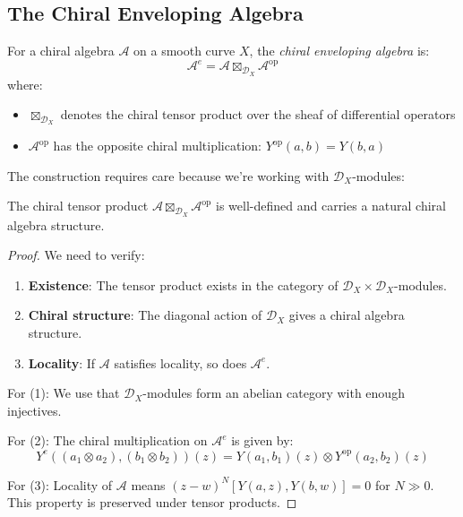 \subsection{The Chiral Enveloping Algebra}

\begin{definition}
For a chiral algebra $\mathcal{A}$ on a smooth curve $X$, the \emph{chiral enveloping algebra} is:
\[
\mathcal{A}^e = \mathcal{A} \boxtimes_{\mathcal{D}_X} \mathcal{A}^{\text{op}}
\]
where:
\begin{itemize}
\item $\boxtimes_{\mathcal{D}_X}$ denotes the chiral tensor product over the sheaf of differential operators
\item $\mathcal{A}^{\text{op}}$ has the opposite chiral multiplication: $Y^{\text{op}}(a,b) = Y(b,a)$
\end{itemize}
\end{definition}

The construction requires care because we're working with $\mathcal{D}_X$-modules:

\begin{lemma}
The chiral tensor product $\mathcal{A} \boxtimes_{\mathcal{D}_X} \mathcal{A}^{\text{op}}$ is well-defined and carries a natural chiral algebra structure.
\end{lemma}

\begin{proof}
We need to verify:
\begin{enumerate}
\item \textbf{Existence}: The tensor product exists in the category of $\mathcal{D}_X \times \mathcal{D}_X$-modules.
\item \textbf{Chiral structure}: The diagonal action of $\mathcal{D}_X$ gives a chiral algebra structure.
\item \textbf{Locality}: If $\mathcal{A}$ satisfies locality, so does $\mathcal{A}^e$.
\end{enumerate}

For (1): We use that $\mathcal{D}_X$-modules form an abelian category with enough injectives.

For (2): The chiral multiplication on $\mathcal{A}^e$ is given by:
\[
Y^e((a_1 \otimes a_2), (b_1 \otimes b_2))(z) = Y(a_1, b_1)(z) \otimes Y^{\text{op}}(a_2, b_2)(z)
\]

For (3): Locality of $\mathcal{A}$ means $(z-w)^N[Y(a,z), Y(b,w)] = 0$ for $N \gg 0$. This property is preserved under tensor products. \qedhere
\end{proof}

